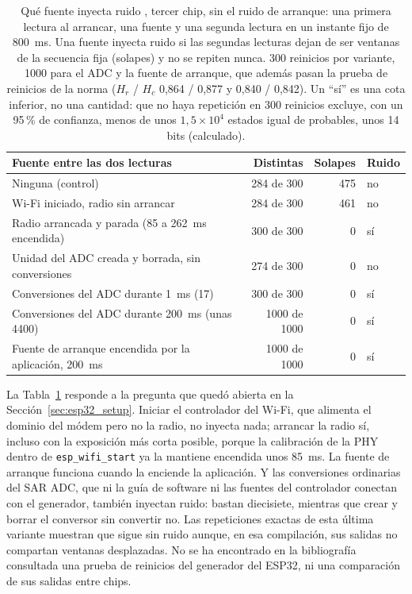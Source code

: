 \begin{table}[htbp]
\centering
\caption{Qué fuente inyecta ruido \meas{}, tercer chip, sin el ruido de
arranque: una primera lectura al arrancar, una fuente y una segunda
lectura en un instante fijo de 800~ms. Una fuente inyecta ruido si las
segundas lecturas dejan de ser ventanas de la secuencia fija (solapes) y
no se repiten nunca. 300 reinicios por variante, 1000 para el ADC y la
fuente de arranque, que además pasan la prueba de reinicios de la norma
($H_r$ / $H_c$ 0,864 / 0,877 y 0,840 / 0,842). Un ``sí'' es una cota
inferior, no una cantidad: que no haya repetición en 300 reinicios
excluye, con un 95\,\% de confianza, menos de unos $1{,}5\times10^4$
estados igual de probables, unos 14 bits (calculado).}
\label{tab:esp32_fuentes}
\footnotesize
\begin{tabular}{@{}lrrl@{}}
\toprule
Fuente entre las dos lecturas & Distintas & Solapes & Ruido \\
\midrule
Ninguna (control)                                   & 284 de 300   & 475 & no \\
Wi-Fi iniciado, radio sin arrancar                  & 284 de 300   & 461 & no \\
Radio arrancada y parada (85 a 262~ms encendida)    & 300 de 300   & 0   & sí \\
Unidad del ADC creada y borrada, sin conversiones   & 274 de 300   & 0   & no \\
Conversiones del ADC durante 1~ms (17)              & 300 de 300   & 0   & sí \\
Conversiones del ADC durante 200~ms (unas 4400)     & 1000 de 1000 & 0   & sí \\
Fuente de arranque encendida por la aplicación, 200~ms & 1000 de 1000 & 0 & sí \\
\bottomrule
\end{tabular}
\end{table}

La Tabla~\ref{tab:esp32_fuentes} responde a la pregunta que quedó
abierta en la Sección~\ref{sec:esp32_setup}. Iniciar el controlador del
Wi-Fi, que alimenta el dominio del módem pero no la radio, no inyecta
nada; arrancar la radio sí, incluso con la exposición más corta posible,
porque la calibración de la PHY dentro de \texttt{esp\_wifi\_start} ya la
mantiene encendida unos 85~ms. La fuente de arranque funciona cuando la
enciende la aplicación. Y las conversiones ordinarias del SAR ADC, que ni
la guía de software ni las fuentes del controlador conectan con el
generador, también inyectan ruido: bastan diecisiete, mientras que crear
y borrar el conversor sin convertir no. Las repeticiones exactas de esta
última variante muestran que sigue sin ruido aunque, en esa compilación,
sus salidas no compartan ventanas desplazadas. No se ha encontrado en la
bibliografía consultada una prueba de reinicios del generador del ESP32,
ni una comparación de sus salidas entre chips.

